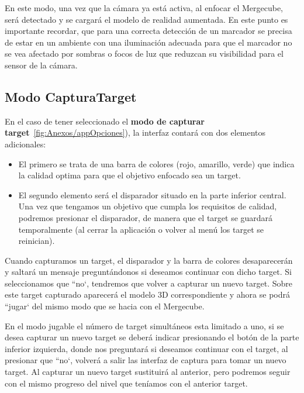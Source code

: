 En este modo, una vez que la cámara ya está activa, al enfocar el Mergecube, será detectado y se cargará el modelo de realidad aumentada. En este punto es importante recordar, que para una correcta detección de un marcador se precisa de estar en un ambiente con una iluminación adecuada para que el marcador no se vea afectado por sombras o focos de luz que reduzcan su visibilidad para el sensor de la cámara.


\subsection{Modo CapturaTarget}

En el caso de tener seleccionado el \textbf{modo de capturar target}~\ref{fig:Anexos/appOpciones}), la interfaz contará con dos elementos adicionales: 
\begin{itemize}
	\item El primero se trata de una barra de colores (rojo, amarillo, verde) que indica la calidad optima para que el objetivo enfocado sea un target.
	\item El segundo elemento será el disparador situado en la parte inferior central. Una vez que tengamos un objetivo que cumpla los requisitos de calidad, podremos presionar el disparador, de manera que el target se guardará temporalmente (al cerrar la aplicación o volver al menú los target se reinician). 
\end{itemize}

Cuando capturamos un target, el disparador y la barra de colores desaparecerán y saltará un mensaje preguntándonos si deseamos continuar con dicho target. Si seleccionamos que ``no`, tendremos que volver a capturar un nuevo target. Sobre este target capturado aparecerá el modelo 3D correspondiente y ahora se podrá ``jugar` del mismo modo que se hacia con el Mergecube. 

En el modo jugable el número de target simultáneos esta limitado a uno, si se desea capturar un nuevo target se deberá indicar presionando el botón de la parte inferior izquierda, donde nos preguntará si deseamos continuar con el target, al presionar que ``no`, volverá a salir las interfaz de captura para tomar un nuevo target. Al capturar un nuevo target sustituirá al anterior, pero podremos seguir con el mismo progreso del nivel que teníamos con el anterior target. 


